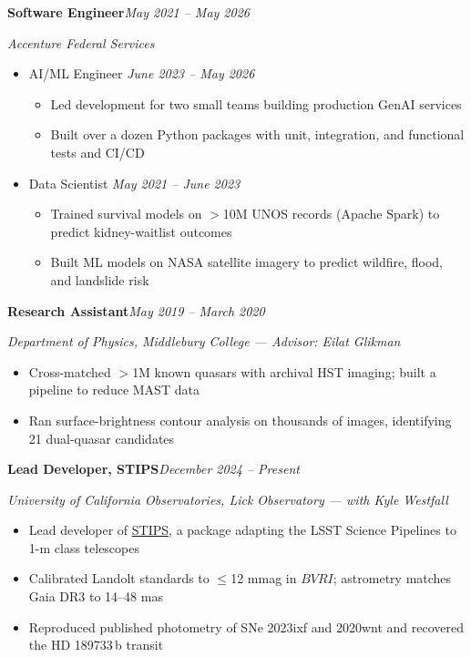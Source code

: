 \documentclass[11pt]{article}
\newcommand{\sectiontitle}[1]{\needspace{6\baselineskip}\vspace{10pt}{\textbf{\large #1}}\par\vspace{-7pt}\hrulefill\par\vspace{4pt}}
\newcommand{\entry}[3]{\textbf{#1}\hfill\textit{#2 -- #3}\par}
\newcommand{\org}[1]{\textit{#1}\par}
\newcommand{\entrygap}{\vspace{6pt}}
\begin{document}
\entrygap
\entry{Software Engineer}{May 2021}{May 2026}
\org{Accenture Federal Services}
\begin{itemize}
    \item AI/ML Engineer \hfill \textit{June 2023 -- May 2026}
    \begin{itemize}
        \item Led development for two small teams building production GenAI services
        \item Built over a dozen Python packages with unit, integration, and functional tests and CI/CD
    \end{itemize}
    \item Data Scientist \hfill \textit{May 2021 -- June 2023}
    \begin{itemize}
        \item Trained survival models on $>$10M UNOS records (Apache Spark) to predict kidney-waitlist outcomes
        \item Built ML models on NASA satellite imagery to predict wildfire, flood, and landslide risk
    \end{itemize}
\end{itemize}

\entrygap
\entry{Research Assistant}{May 2019}{March 2020}
\org{Department of Physics, Middlebury College --- Advisor: Eilat Glikman}
\begin{itemize}
    \item Cross-matched $>$1M known quasars with archival HST imaging; built a pipeline to reduce MAST data
    \item Ran surface-brightness contour analysis on thousands of images, identifying 21 dual-quasar candidates
\end{itemize}

\sectiontitle{Independent Research}

\entry{Lead Developer, STIPS}{December 2024}{Present}
\org{University of California Observatories, Lick Observatory --- with Kyle Westfall}
\begin{itemize}
    \item Lead developer of \href{https://github.com/dangause/stips}{STIPS}, a package adapting the LSST Science Pipelines to 1-m class telescopes
    \item Calibrated Landolt standards to $\leq$12 mmag in $BVRI$; astrometry matches Gaia DR3 to 14--48 mas
    \item Reproduced published photometry of SNe 2023ixf and 2020wnt and recovered the HD 189733\,b transit
\end{itemize}
\end{document}
